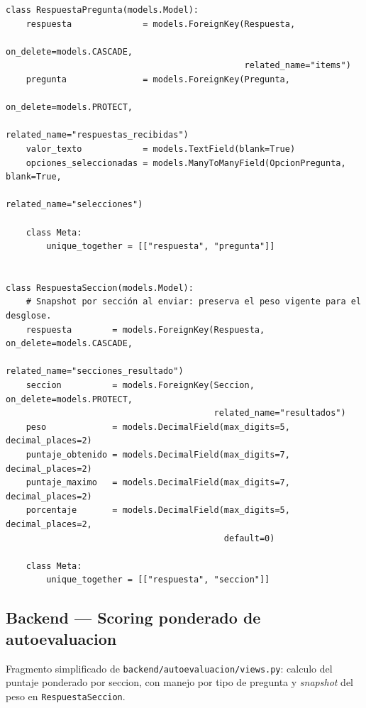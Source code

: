 \begin{Verbatim}[fontsize=\small, frame=single]
class RespuestaPregunta(models.Model):
    respuesta              = models.ForeignKey(Respuesta,
                                               on_delete=models.CASCADE,
                                               related_name="items")
    pregunta               = models.ForeignKey(Pregunta,
                                               on_delete=models.PROTECT,
                                               related_name="respuestas_recibidas")
    valor_texto            = models.TextField(blank=True)
    opciones_seleccionadas = models.ManyToManyField(OpcionPregunta, blank=True,
                                                    related_name="selecciones")

    class Meta:
        unique_together = [["respuesta", "pregunta"]]


class RespuestaSeccion(models.Model):
    # Snapshot por sección al enviar: preserva el peso vigente para el desglose.
    respuesta        = models.ForeignKey(Respuesta, on_delete=models.CASCADE,
                                         related_name="secciones_resultado")
    seccion          = models.ForeignKey(Seccion, on_delete=models.PROTECT,
                                         related_name="resultados")
    peso             = models.DecimalField(max_digits=5, decimal_places=2)
    puntaje_obtenido = models.DecimalField(max_digits=7, decimal_places=2)
    puntaje_maximo   = models.DecimalField(max_digits=7, decimal_places=2)
    porcentaje       = models.DecimalField(max_digits=5, decimal_places=2,
                                           default=0)

    class Meta:
        unique_together = [["respuesta", "seccion"]]
\end{Verbatim}

\subsection{Backend --- Scoring ponderado de autoevaluacion}\label{lst:scoring}

Fragmento simplificado de \texttt{backend/autoevaluacion/views.py}: calculo del puntaje ponderado por seccion, con manejo por tipo de pregunta y \emph{snapshot} del peso en \texttt{RespuestaSeccion}.

